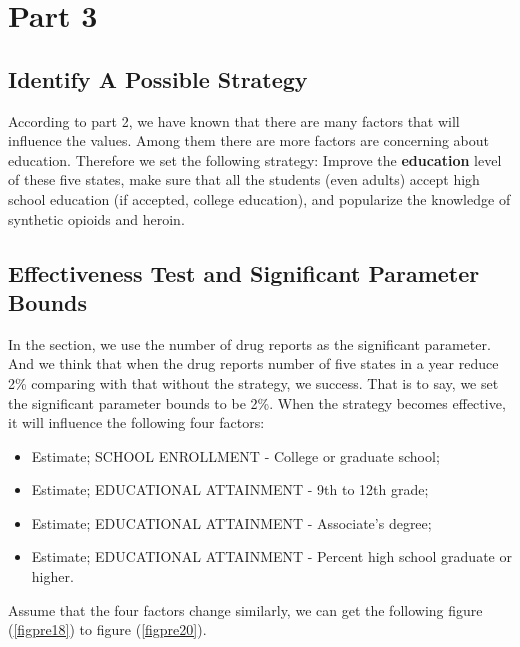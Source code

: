 \documentclass{mcmthesis}
\numberwithin{equation}{section}
\numberwithin{figure}{section}
\numberwithin{table}{section}
\theoremstyle{mydef}
\begin{document}
\section{Part 3}

\subsection{Identify A Possible Strategy}

According to part 2, we have known that there are many factors that will influence the values. Among them there are more factors are concerning about education. Therefore we set the following strategy: Improve the {\bf{education}} level of these five states, make sure that all the students (even adults) accept high school education (if accepted, college education), and popularize the knowledge of synthetic opioids and heroin.

\subsection{Effectiveness Test and Significant Parameter Bounds}

In the section, we use the number of drug reports as the significant parameter. And we think that when the drug reports number of five states in a year reduce 2\% comparing with that without the strategy, we success. That is to say, we set the significant parameter bounds to be 2\%. When the strategy becomes effective, it will influence the following four factors:
\begin{itemize}[]
\item Estimate; SCHOOL ENROLLMENT - College or graduate school;
\item Estimate; EDUCATIONAL ATTAINMENT - 9th to 12th grade;
\item
Estimate; EDUCATIONAL ATTAINMENT - Associate's degree;
\item  Estimate; EDUCATIONAL ATTAINMENT - Percent high school graduate or higher.
\end{itemize}

Assume that the four factors change similarly, we can get the following figure (\ref{figpre18}) to figure (\ref{figpre20}).
\end{document}

